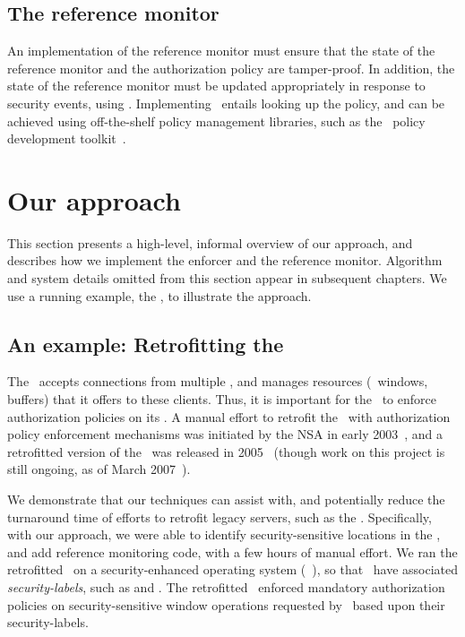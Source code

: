 \subsection{The reference monitor}
\label{chapter:overview:basictools:reference-monitor}
%
An implementation of the reference monitor must ensure that the state of the
reference monitor and the authorization policy are tamper-proof. In addition,
the state of the reference monitor must be updated appropriately in response to
security events, using \update. Implementing \return\ entails looking up the
policy, and can be achieved using off-the-shelf policy management libraries,
such as the \selinux\ policy development toolkit~\cite{tresys1, tresys2}.


\section{Our approach}
\label{chapter:overview:approach}

This section presents a high-level, informal overview of our approach, and
describes how we implement the enforcer and the reference monitor. Algorithm
and system details omitted from this section appear in subsequent chapters. 
We use a running example, the \xserver, to illustrate the approach.

\subsection{An example: Retrofitting the \xserver}
\label{chapter:overview:approach:example-xserver}


The \xserver\ accepts connections from multiple \xclients, and manages
resources (\eg~windows, buffers) that it offers to these clients.  Thus, it is
important for the \xserver\ to enforce authorization policies on its \xclients.
A manual effort to retrofit the \xserver\ with authorization policy enforcement
mechanisms was initiated by the NSA in early 2003~\cite{ksv03}, and a
retrofitted version of the \xserver\ was released in 2005~\cite{s05a} (though
work on this project is still ongoing, as of March 2007~\cite{w07}).


We demonstrate that our techniques can assist with, and potentially reduce the
turnaround time of efforts to retrofit legacy servers, such as the \xserver.
Specifically, with our approach, we were able to identify security-sensitive
locations in the \xserver, and add reference monitoring code, with a few hours
of manual effort. We ran the retrofitted \xserver\ on a security-enhanced
operating system (\selinux~\cite{ls01a}), so that \xclients\ have associated
\textit{security-labels}, such as  and
.  The retrofitted \xserver\ enforced mandatory
authorization policies on security-sensitive window operations requested by
\xclients\ based upon their security-labels.

